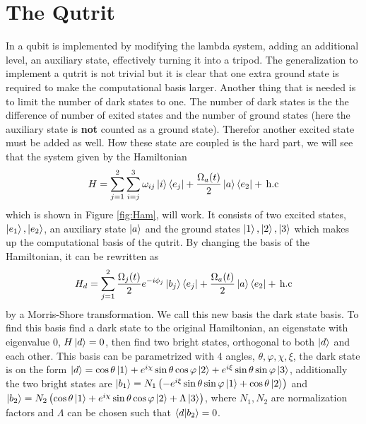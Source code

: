 

\section{The Qutrit}
In \cite{darkpath} a qubit is implemented by modifying the lambda system, adding an additional level, an auxiliary state, effectively turning it into a tripod. 
The generalization to implement a qutrit is not trivial but it is clear that one extra ground state is required to make the computational basis larger. Another thing that is needed is to limit the number of dark states to one. The number of dark states is the the difference of number of exited states and the number of ground states\cite{lambda} (here the auxiliary state is \textbf{not} counted as a ground state). Therefor another excited state must be added as well. How these state are coupled is the hard part, we will see that the system given by the Hamiltonian
\begin{equation}
\label{eq:Ham}
H = \sum_{j = 1}^2 \sum_{i =j}^{3} \omega_{ij}\ket{i}\bra{e_j}  + \frac{\Omega_{a}(t)}{2}\ket{a}\bra{e_2}  +\,\text{h.c}
\end{equation}
which is shown in Figure \ref{fig:Ham}, will work.  It consists of two excited states, $\ket{e_1}, \ket{e_2}$, an auxiliary state $\ket{a}$ and the ground states $\ket{1}, \ket{2}, \ket{3}$ which 
makes up the computational basis of the qutrit. By changing the basis of the Hamiltonian, it can be rewritten as 
\begin{equation}
\label{eq:Hamd}
H_d = \sum_{j = 1}^2 \frac{\Omega_j(t)}{2}e^{-i\phi_j}\ket{b_j}\bra{e_j}  + \frac{\Omega_a(t)}{2}\ket{a}\bra{e_2}  +\,\text{h.c}
\end{equation} 
by a Morris-Shore transformation\cite{morris}. We call this new basis the dark state basis. To find this basis find a dark state to the original  Hamiltonian, an eigenstate with eigenvalue $0$, $H\ket{d} = 0$, then find two bright states, orthogonal to both $\ket{d}$ and each other. This basis can be parametrized with 4 angles, $\theta, \varphi, \chi, \xi$, the dark state is on the form $\ket{d} = \cos\theta\ket{1} + e^{i\chi}\sin\theta\cos\varphi\ket{2} + e^{i\xi}\sin\theta\sin\varphi\ket{3}$, additionally the two bright states are $\ket{b_1} = N_1 \left(-e^{i\xi}\sin\theta\sin\varphi\ket{1} + \cos\theta\ket{2} \right)$ and $\ket{b_2} = N_2 \left(\cos\theta\ket{1} +  e^{i\chi}\sin\theta\cos\varphi\ket{2} + \Lambda \ket{3}\right ) $, where $N_1, N_2$ are normalization factors and $\Lambda$ can be chosen such that $\bra{d}\ket{b_2} = 0$.

